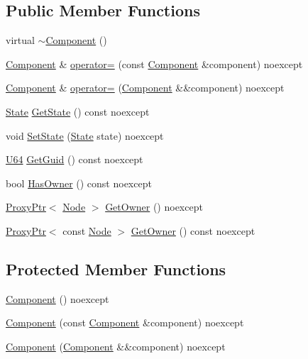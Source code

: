 \subsection*{Public Member Functions}
\begin{DoxyCompactItemize}
\item 
virtual \hyperlink{classmage_1_1_component_a2326c6df733b0cabf3086ad4187ba607}{$\sim$\+Component} ()
\item 
\hyperlink{classmage_1_1_component}{Component} \& \hyperlink{classmage_1_1_component_a36f7fbb5f82fc7979d4e7d08389815ae}{operator=} (const \hyperlink{classmage_1_1_component}{Component} \&component) noexcept
\item 
\hyperlink{classmage_1_1_component}{Component} \& \hyperlink{classmage_1_1_component_ad45dae559785efbc090c0f83c1e08cd1}{operator=} (\hyperlink{classmage_1_1_component}{Component} \&\&component) noexcept
\item 
\hyperlink{namespacemage_ae47d13d8477ee94893b9a3947d28eebc}{State} \hyperlink{classmage_1_1_component_a56f63648ba479decbba4a6fbaa544b4d}{Get\+State} () const noexcept
\item 
void \hyperlink{classmage_1_1_component_a95a74e2df3f326c4e92ac6dea7ed97be}{Set\+State} (\hyperlink{namespacemage_ae47d13d8477ee94893b9a3947d28eebc}{State} state) noexcept
\item 
\hyperlink{namespacemage_a6672cf3c861707ce4a3235a3eb43941d}{U64} \hyperlink{classmage_1_1_component_a1af8d5d8d09e5de54851ebed22153571}{Get\+Guid} () const noexcept
\item 
bool \hyperlink{classmage_1_1_component_a8e62e223bdacc3eebddc43f8ebc8c4d9}{Has\+Owner} () const noexcept
\item 
\hyperlink{classmage_1_1_proxy_ptr}{Proxy\+Ptr}$<$ \hyperlink{classmage_1_1_node}{Node} $>$ \hyperlink{classmage_1_1_component_af6261b2a7688dd5a078a917e1ec69e0b}{Get\+Owner} () noexcept
\item 
\hyperlink{classmage_1_1_proxy_ptr}{Proxy\+Ptr}$<$ const \hyperlink{classmage_1_1_node}{Node} $>$ \hyperlink{classmage_1_1_component_a97f402d0f75eff5a893abd2821a5335d}{Get\+Owner} () const noexcept
\end{DoxyCompactItemize}
\subsection*{Protected Member Functions}
\begin{DoxyCompactItemize}
\item 
\hyperlink{classmage_1_1_component_aef66a6573c094143bf95d3a81df1098e}{Component} () noexcept
\item 
\hyperlink{classmage_1_1_component_abcd9e6ba7f9691f51d1802d5cf8a365a}{Component} (const \hyperlink{classmage_1_1_component}{Component} \&component) noexcept
\item 
\hyperlink{classmage_1_1_component_a3abb21d27d4e89513787396c27b0ff6d}{Component} (\hyperlink{classmage_1_1_component}{Component} \&\&component) noexcept
\end{DoxyCompactItemize}

